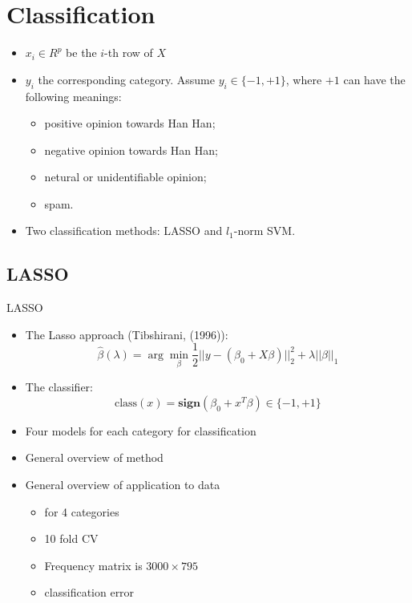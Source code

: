 \documentclass[12pt, trans]{beamer}
\newcommand{\1}[1]{{\mathbf 1}\left\{#1\right\}}        %
\begin{document}
\clearpage 
\section{Classification}
\begin{frame}
\begin{itemize}[<+->]
\item $x_i\in R^{p}$ be the $i$-th row of $X$
\item $y_i$ the corresponding category. Assume $y_i\in\{-1,+1\}$, where $+1$ can have the following meanings:
  \begin{itemize}[<+->]
    \item positive opinion towards Han Han; 
    \item negative opinion towards Han Han; 
    \item netural or unidentifiable opinion; 
    \item spam. 
\end{itemize}
\item Two classification methods: LASSO and $l_1$-norm SVM.
\end{itemize}
\end{frame}
\subsection{LASSO}

\begin{frame}[fragile]{LASSO}
\begin{itemize}[<+->]

\item The Lasso approach (Tibshirani, (1996)):
\[
\hat{\beta}(\lambda) = \arg \min_\beta \frac{1}{2}||y-(\beta_0+X\beta)||_2^2 + \lambda ||\beta||_1
\]
\item The classifier:
\[
\text{class}(x) = \textbf{sign}(\beta_0+x^T\beta)\in\{-1,+1\}
\]

\item Four models for each category for classification
\item General overview of method
\item General overview of application to data
	\begin{itemize}
	\item for 4 categories
	\item 10 fold CV
	\item Frequency matrix is $3000 \times 795$
	\item classification error
	\end{itemize}
	
\end{itemize}

\end{frame}
\end{document}

